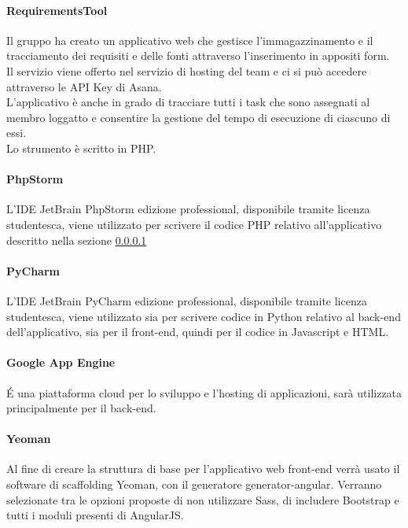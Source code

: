 			\paragraph{RequirementsTool}
			\label{par:requirements_tool}
			Il gruppo ha creato un applicativo web che gestisce l'immagazzinamento e il tracciamento dei requisiti e delle fonti attraverso l'inserimento in appositi form. \\
			Il servizio viene offerto nel servizio di hosting del team e ci si può accedere attraverso le API Key di Asana. \\
			L'applicativo è anche in grado di tracciare tutti i task che sono assegnati al membro loggatto e consentire la gestione del tempo di esecuzione di ciascuno di essi. \\
			Lo strumento è scritto in PHP.

			\paragraph{PhpStorm} %
			\label{par:php_storm}
			L'IDE JetBrain PhpStorm edizione professional, disponibile tramite licenza studentesca, viene utilizzato per scrivere il codice PHP relativo all'applicativo descritto nella sezione \ref{par:requirements_tool}
			\paragraph{PyCharm}
			L'IDE JetBrain PyCharm edizione professional, disponibile tramite licenza studentesca, viene utilizzato sia per scrivere codice in Python relativo al back-end dell'applicativo, sia per il front-end, quindi per il codice in Javascript e HTML.
			\paragraph{Google App Engine}
			\'E una piattaforma cloud per lo sviluppo e l'hosting di applicazioni, sarà utilizzata principalmente per il back-end.

			\paragraph{Yeoman}
			\label{par:yeoman}
			Al fine di creare la struttura di base per l'applicativo web front-end verrà usato il software di scaffolding Yeoman, con il generatore generator-angular. \newline
			Verranno selezionate tra le opzioni proposte di non utilizzare Sass, di includere Bootstrap e tutti i moduli presenti di AngularJS.
